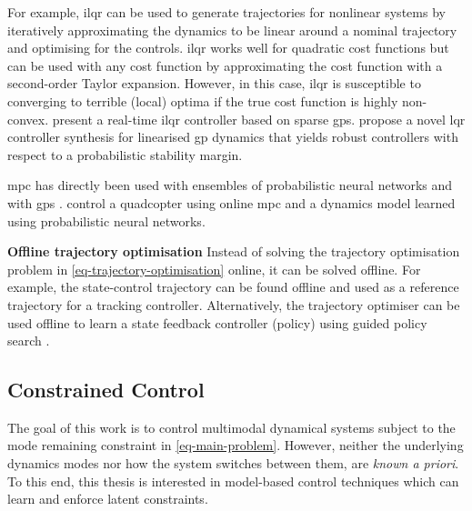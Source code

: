 \documentclass{mimosis-class/mimosis}
\numberwithin{equation}{chapter}
\begin{document}
For example, \acrfull{ilqr} can be used to generate trajectories for nonlinear systems by
iteratively approximating the dynamics to be linear around a nominal trajectory and optimising for the controls.
\acrshort{ilqr} works well for quadratic cost functions but can be used with any cost function by approximating the cost
function with a second-order Taylor expansion.
However, in this case, \acrshort{ilqr} is susceptible to converging
to terrible (local) optima if the true cost function is highly non-convex.
\cite{boedeckerApproximate2014} present a real-time \acrshort{ilqr} controller based on sparse \acrshort{gps}.
\cite{rohrProbabilistic2021} propose a novel \acrshort{lqr} controller synthesis for
linearised \acrshort{gp} dynamics that yields robust controllers with respect to a probabilistic stability margin.

\acrshort{mpc} has directly been used with ensembles of probabilistic neural networks \citep{chuaDeep2018,nagabandiDeep2020}
and with \acrshort{gps} \citep{kamtheDataEfficient2018}.
\cite{lambertLowLevel2019} control a quadcopter using online \acrshort{mpc} and a dynamics model learned using
probabilistic neural networks.

\textbf{Offline trajectory optimisation}
Instead of solving the trajectory optimisation problem in \cref{eq-trajectory-optimisation} online,
it can be solved offline.
For example, the state-control trajectory can be found offline and used as a reference trajectory
for a tracking controller.
Alternatively, the trajectory optimiser can be used offline to learn a state feedback controller (policy)
using guided policy search \citep{levineGuided2013}.

\subsection{Constrained Control}
\label{sec:org2c4bc86}
The goal of this work is to control multimodal dynamical systems subject to the mode remaining
constraint in \cref{eq-main-problem}.
However, neither the underlying dynamics modes nor how the system switches between them, are \emph{known a priori}.
To this end, this thesis is interested in model-based control techniques which can
learn and enforce latent constraints.
\end{document}
